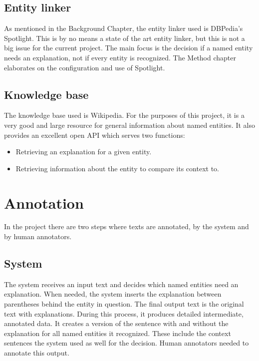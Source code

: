 \documentclass[
10pt, %
a4paper, %
oneside, %
headinclude,footinclude, %
] {book}%
\begin{document}
\subsection{Entity linker}
As mentioned in the Background Chapter, the entity linker used is DBPedia's Spotlight.
This is by no means a state of the art entity linker, but this is not a big issue for the current project.
The main focus is the decision if a named entity needs an explanation, not if every entity is recognized.
The Method chapter elaborates on the configuration and use of Spotlight.

\subsection{Knowledge base}
The knowledge base used is Wikipedia.
For the purposes of this project, it is a very good and large resource for general information about named entities.
It also provides an excellent open API which serves two functions:

\begin{itemize}
  \item Retrieving an explanation for a given entity.
  \item Retrieving information about the entity to compare its context to.
\end{itemize}
\newpage

\section{Annotation}
In the project there are two steps where texts are annotated, by the system and by human annotators.

\subsection{System}
The system receives an input text and decides which named entities need an explanation.
When needed, the system inserts the explanation between parentheses behind the entity in question.
The final output text is the original text with explanations.
During this process, it produces detailed intermediate, annotated data.
It creates a version of the sentence with and without the explanation for all named entities it recognized.
These include the context sentences the system used as well for the decision.
Human annotators needed to annotate this output.
\end{document}
